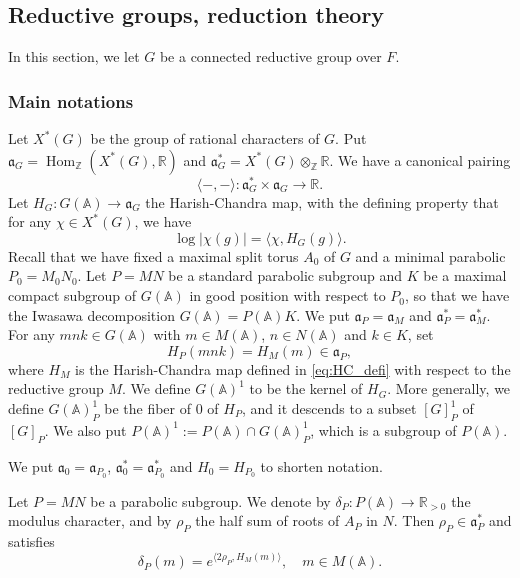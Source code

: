 \documentclass[letterpaper,11pt]{amsart}
\newcommand{\fa}{\mathfrak{a}}
\newcommand{\bA}{\mathbb{A}}
\newcommand{\R}{\mathbb{R}}
\newcommand{\Z}{\mathbb{Z}}
\newcommand{\<}{\negthickspace}
\providecommand{\abs}[1]{\lvert#1\rvert}
\DeclareMathOperator{\Hom}{Hom}
\theoremstyle{definition}
\theoremstyle{plain}
\theoremstyle{remark}
\numberwithin{equation}{section}
\begin{document}
\subsection{Reductive groups, reduction theory}
\label{subsec:reduction_theory}

In this section, we let $G$ be a connected reductive group over $F$. 

\subsubsection{Main notations}
Let $X^*(G)$ be the group of rational characters of $G$. Put $\fa_G = \Hom_{\Z}(X^*(G), \R)$ and $\fa_G^* = X^*(G) \otimes_{\Z} \R$. We
have a canonical pairing
    \[
    \langle-,-\rangle: \fa_G^* \times \fa_G \to \R.
    \]
Let $H_G: G(\bA) \to \fa_G$ the Harish-Chandra map, with the defining
property that for any $\chi \in X^*(G)$, we have
\begin{equation}
\label{eq:HC_defi}
     \log\abs{\chi(g)} = \langle  \chi, H_G(g) \rangle.
\end{equation}
Recall that we have fixed a maximal split torus $A_0$ of $G$ and a minimal parabolic $P_0=M_0 N_0$. Let $P = MN$ be a standard parabolic subgroup and $K$ be a maximal compact subgroup of $G(\bA)$ in good position with respect to $P_0$, so that we have the Iwasawa decomposition $G(\bA) = P(\bA)K$. We put $\fa_P = \fa_M$ and $\fa_P^* =
\fa_M^*$. For any $mnk \in G(\bA)$ with $m \in M(\bA)$, $n \in N(\bA)$ and $k \in K$, set
\begin{equation*}
    H_P(mnk) = H_M(m) \in \fa_P,
\end{equation*}
where $H_M$ is the Harish-Chandra map defined in \eqref{eq:HC_defi} with respect to the reductive group $M$. We define $G(\bA)^1$ to be the kernel of $H_G$. More generally, we define $G(\bA)_P^1$ be the fiber of $0$ of $H_P$, and it descends to a subset $[G]_P^1$ of $[G]_P$. We also put $P(\bA)^1 := P(\bA) \cap G(\bA)^1_P$, which is a subgroup of $P(\bA)$.

We put $\fa_0 = \fa_{P_0}$, $\fa_0^* = \fa_{P_0}^*$ and $H_0 = H_{P_0}$ to shorten notation.

Let $P = MN$ be a parabolic subgroup. We denote by $\delta_P: P(\bA) \to \R_{>0}$ the modulus character, and by $\rho_P$ the half sum of roots of $A_P$ in $N$. Then $\rho_P \in \fa_P^*$ and satisfies
    \[
    \delta_P(m) = e^{\langle 2\rho_P, H_M(m) \rangle}, \quad m \in M(\bA).
    \]
\end{document}
